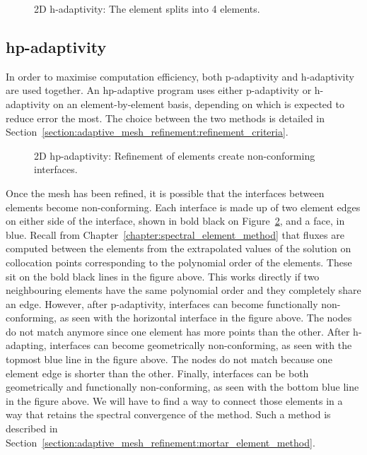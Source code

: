 \begin{figure}[H]
	\centering
	
	\caption{2D h-adaptivity: The element splits into 4 elements.}
	\label{fig:h-adaptivity}
\end{figure}

\subsection{hp-adaptivity} \label{subsection:adaptive_mesh_refinement:adaptivity_strategies:hp-adaptivity}

In order to maximise computation efficiency, both p-adaptivity and h-adaptivity are used together.
An hp-adaptive program uses either p-adaptivity or h-adaptivity on an element-by-element basis,
depending on which is expected to reduce error the most. The choice between the two methods is
detailed in Section~\ref{section:adaptive_mesh_refinement:refinement_criteria}.

\begin{figure}[H]
	\centering
	
	\caption{2D hp-adaptivity: Refinement of elements create non-conforming interfaces.}
	\label{fig:hp-adaptivity}
\end{figure}

Once the mesh has been refined, it is possible that the interfaces between elements become
non-conforming. Each interface is made up of two element edges on either side of the interface,
shown in bold black on Figure~\ref{fig:hp-adaptivity}, and a face, in blue. Recall from
Chapter~\ref{chapter:spectral_element_method} that fluxes are computed between the elements from the
extrapolated values of the solution on collocation points corresponding to the polynomial order of
the elements. These sit on the bold black lines in the figure above. This works directly if two
neighbouring elements have the same polynomial order and they completely share an edge. However,
after p-adaptivity, interfaces can become functionally non-conforming, as seen with the horizontal
interface in the figure above. The nodes do not match anymore since one element has more points than
the other. After h-adapting, interfaces can become geometrically non-conforming, as seen with the
topmost blue line in the figure above. The nodes do not match because one element edge is shorter
than the other. Finally, interfaces can be both geometrically and functionally non-conforming, as
seen with the bottom blue line in the figure above. We will have to find a way to connect those
elements in a way that retains the spectral convergence of the method. Such a method is described in
Section~\ref{section:adaptive_mesh_refinement:mortar_element_method}.

